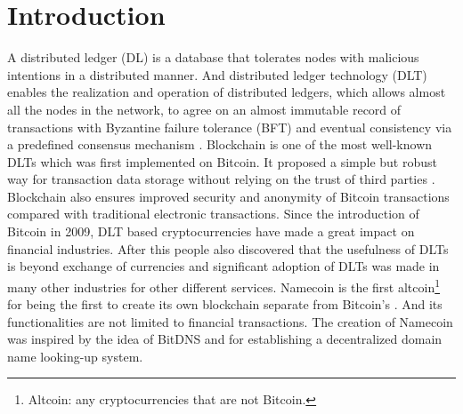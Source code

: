 \section{Introduction}
\label{sec:introduction}

A distributed ledger (DL) is a database that tolerates nodes with malicious intentions in a distributed manner.
And distributed ledger technology (DLT) enables the realization and operation of distributed ledgers,
which allows almost all the nodes in the network, to agree on an almost immutable record of transactions with Byzantine failure tolerance (BFT) and eventual consistency via a predefined consensus mechanism \cite{Sunyaev2020}.
Blockchain is one of the most well-known DLTs which was first implemented on Bitcoin. It proposed a simple but robust way for transaction data storage without relying on the trust of third parties \cite{nakamoto2008peer}.
Blockchain also ensures improved security and anonymity of Bitcoin transactions compared with traditional electronic transactions.
Since the introduction of Bitcoin in 2009, DLT based cryptocurrencies have made a great impact on financial industries. After this people also discovered that the usefulness of DLTs is beyond exchange of currencies and
significant adoption of DLTs was made in many other industries for other different services.
Namecoin is the first altcoin\footnote{Altcoin: any cryptocurrencies that are not Bitcoin.} for being the first to create its own blockchain separate from Bitcoin's \cite{kalodner2015empirical}.
And its functionalities are not limited to financial transactions.
The creation of Namecoin was inspired by the idea of BitDNS \cite{merited2010bitdns} and for establishing a decentralized domain name looking-up system.


